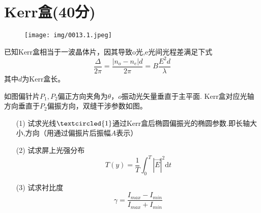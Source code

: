 \documentclass{article}
\begin{document}
\section*{Kerr盒(40分)}
\begin{wrapfigure}{r}{5cm}
	\vspace{-15pt}    %
	\texttt{[image: img/0013.1.jpeg]}\\
	\vspace{-15pt}    %
	\caption{}
	\vspace{-15pt}    %
\end{wrapfigure}
 已知Kerr盒相当于一波晶体片，因其导致o光,e光间光程差满足下式$$\dfrac{\Delta}{2\pi}=\dfrac{|n_o-n_e|d}{2\pi}=B\dfrac{E^2 d}{\lambda}$$其中$d$为Kerr盒长。\par
如图偏针片$P_1, P_2$偏正方向夹角为$\theta$，$o$振动光矢量垂直于主平面.
Kerr盒对应光轴方向垂直于$P_2$偏振方向，双缝干涉参数如图。
\begin{itemize}
    \item[(1)] 试求光线$\textcircled{1}$通过Kerr盒后椭圆偏振光的椭圆参数.即长轴大小,方向（用通过偏振片后振幅$A$表示）
    \item[(2)] 试求屏上光强分布$$T(y)=\dfrac{1}{T}\int^T_0|\vec{E}|^2\mathrm{d} t$$
    \item[(3)] 试求衬比度$$\gamma=\dfrac{I_{max}-I_{min}}{I_{max}+I_{min}}$$
\end{itemize}
\end{document}
